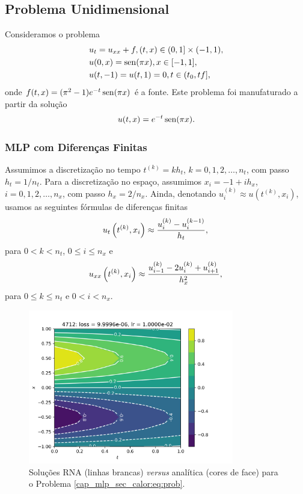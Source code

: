 \subsection{Problema Unidimensional}

Consideramos o problema
\begin{subequations}
  \begin{align}
    &u_t = u_{xx} + f, (t,x)\in (0, 1] \times (-1, 1),\\
    &u(0,x) = \operatorname{sen}(\pi x), x\in [-1, 1],\\
    &u(t,-1) = u(t,1) = 0, t\in (t_0, tf],
  \end{align}
\end{subequations}
onde $f(t,x) = (\pi^2 - 1)e^{-t}\operatorname{sen}(\pi x)$ é a fonte. Este problema foi manufaturado a partir da solução
\begin{equation}
  u(t,x) = e^{-t}\operatorname{sen}(\pi x).
\end{equation}

\subsubsection{MLP com Diferenças Finitas}

Assumimos a discretização no tempo $t^{(k)} = kh_t$, $k = 0, 1, 2, \dotsc, n_t$, com passo $h_t = 1/n_t$. Para a discretização no espaço, assumimos $x_{i} = -1 + ih_x$, $i = 0, 1, 2, \dotsc, n_x$, com passo $h_x = 2/n_x$. Ainda, denotando $u^{(k)}_i \approx u\left(t^{(k)}, x_i\right)$, usamos as seguintes fórmulas de diferenças finitas
\begin{equation}
  u_t\left(t^{(k)}, x_i\right) \approx \frac{u_i^{(k)} - u_i^{(k-1)}}{h_t},\\
\end{equation}
para $0<k<n_t$, $0\leq i\leq n_x$ e
\begin{equation}
  u_{xx}\left(t^{(k)}, x_i\right) \approx \frac{u_{i-1}^{(k)} - 2u_i^{(k)} + u_{i+1}^{(k)}}{h_x^2},\\
\end{equation}
para $0\leq k\leq n_t$ e $0 < i < n_x$.

\begin{figure}[H]
  \centering
  \includegraphics[width=0.8\textwidth]{./cap_mlp/dados/fig_mlp_calor/fig}
  \caption{Soluções RNA (linhas brancas) \textit{versus} analítica (cores de face) para o Problema \ref{cap_mlp_sec_calor:eq:prob}.}
  \label{cap_mlp_sec_calor:fig:rna_calor}
\end{figure}

